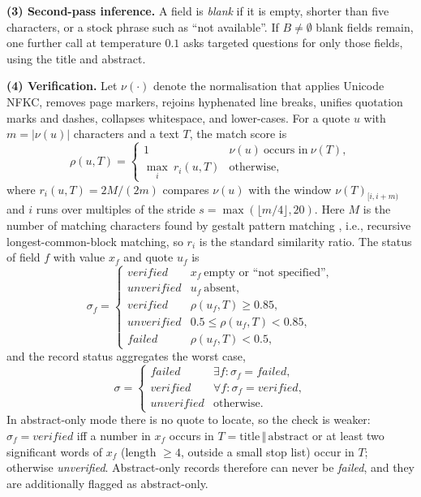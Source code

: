 \documentclass[conference]{IEEEtran}
\begin{document}
\textbf{(3) Second-pass inference.} A field is \emph{blank} if it is empty, shorter than five characters, or a stock phrase such as ``not available''. If $B\ne\emptyset$ blank fields remain, one further call at temperature $0.1$ asks targeted questions for only those fields, using the title and abstract.

\textbf{(4) Verification.} Let $\nu(\cdot)$ denote the normalisation that applies Unicode NFKC, removes page markers, rejoins hyphenated line breaks, unifies quotation marks and dashes, collapses whitespace, and lower-cases. For a quote $u$ with $m=|\nu(u)|$ characters and a text $T$, the match score is
\begin{equation}
\rho(u,T)=\begin{cases}1 & \nu(u)\ \text{occurs in}\ \nu(T),\\[2pt] \max_{i}\ r_i(u,T) & \text{otherwise,}\end{cases}
\label{eq:rho}
\end{equation}
where $r_i(u,T)=2M/(2m)$ compares $\nu(u)$ with the window $\nu(T)_{[i,i+m)}$ and $i$ runs over multiples of the stride $s=\max(\lfloor m/4\rfloor,20)$. Here $M$ is the number of matching characters found by gestalt pattern matching \cite{ratcliff1988gestalt}, i.e., recursive longest-common-block matching, so $r_i$ is the standard similarity ratio. The status of field $f$ with value $x_f$ and quote $u_f$ is
\begin{equation}
\sigma_f=\begin{cases}
\textit{verified} & x_f\ \text{empty or ``not specified''},\\
\textit{unverified} & u_f\ \text{absent},\\
\textit{verified} & \rho(u_f,T)\ge 0.85,\\
\textit{unverified} & 0.5\le\rho(u_f,T)<0.85,\\
\textit{failed} & \rho(u_f,T)<0.5,
\end{cases}
\label{eq:sigmaf}
\end{equation}
and the record status aggregates the worst case,
\begin{equation}
\sigma=\begin{cases}
\textit{failed} & \exists f:\sigma_f=\textit{failed},\\
\textit{verified} & \forall f:\sigma_f=\textit{verified},\\
\textit{unverified} & \text{otherwise.}
\end{cases}
\label{eq:sigma}
\end{equation}
In abstract-only mode there is no quote to locate, so the check is weaker: $\sigma_f=\textit{verified}$ iff a number in $x_f$ occurs in $T=\text{title}\,\Vert\,\text{abstract}$ or at least two significant words of $x_f$ (length $\ge4$, outside a small stop list) occur in $T$; otherwise \textit{unverified}. Abstract-only records therefore can never be \textit{failed}, and they are additionally flagged as abstract-only.
\end{document}

